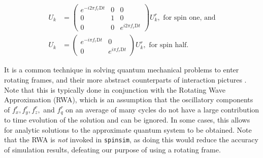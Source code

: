 \documentclass{jors}
\begin{document}
			\begin{align}
				U_k &= \begin{pmatrix}
					e^{-i 2\pi f_r \mathrm{D}t} & 0 & 0\\
					0 & 1 & 0\\
					0 & 0 & e^{i 2\pi f_r \mathrm{D}t}
				\end{pmatrix} U^r_k, \textrm{ for spin one, and}\\
				U_k &= \begin{pmatrix}
					e^{-i \pi f_r \mathrm{D}t} & 0\\
					0 & e^{i \pi f_r \mathrm{D}t}
				\end{pmatrix} U^r_k, \textrm{ for spin half.}
			\end{align}

			It is a common technique in solving quantum mechanical problems to enter rotating frames, and their more abstract counterparts of interaction pictures \cite{j_j_sakurai_jun_john_modern_1994}. Note that this is typically done in conjunction with the Rotating Wave Approximation (RWA), which is an assumption that the oscillatory components of \(f^r_x, f^r_y, f^r_z,\) and \(f^r_q\) on an average of many cycles do not have a large contribution to time evolution of the solution and can be ignored. In some cases, this allows for analytic solutions to the approximate quantum system to be obtained. Note that the RWA is \emph{not} invoked in \texttt{spinsim}, as doing this would reduce the accuracy of simulation results, defeating our purpose of using a rotating frame.
			
			
\end{document}
